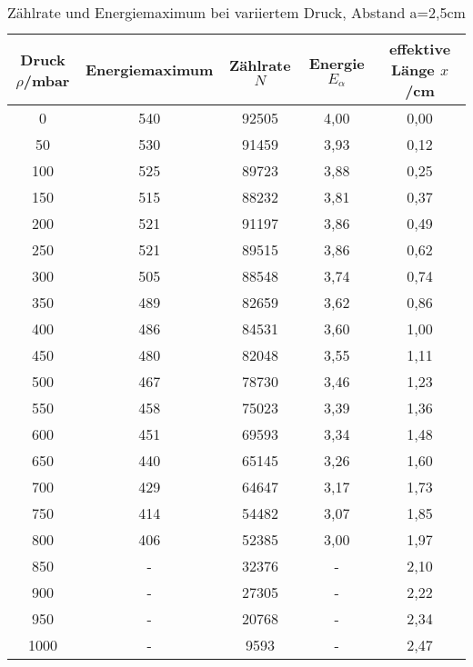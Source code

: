 \begin{table}[H]
  \centering
  \caption{Zählrate und Energiemaximum bei variiertem Druck, Abstand a=2,5cm}
  \label{tab:tab1}
    \begin{tabular}{c c c c c}
    \toprule
    Druck $\rho$/\;mbar & Energiemaximum & Zählrate $N$ & Energie $E_{\alpha}$ & effektive Länge $x$/\;cm\\
    \midrule
    0 & 540 & 92505 & 4,00 & 0,00\\
    50 & 530 & 91459& 3,93 & 0,12\\
    100 & 525 & 89723& 3,88 & 0,25\\
    150 & 515 & 88232& 3,81 & 0,37\\
    200 & 521 & 91197&3,86 & 0,49\\
    250 & 521 & 89515& 3,86 & 0,62\\
    300 & 505 & 88548& 3,74& 0,74\\
    350 & 489 & 82659& 3,62 & 0,86\\
    400 & 486 & 84531 & 3,60 & 1,00\\
    450 & 480 & 82048 & 3,55 & 1,11\\
    500 & 467 & 78730 & 3,46 & 1,23\\
    550 & 458 & 75023 & 3,39 & 1,36\\
    600 & 451 & 69593 & 3,34 & 1,48\\
    650 & 440 & 65145& 3,26 & 1,60\\
    700 & 429 & 64647& 3,17 & 1,73\\
    750 & 414 & 54482& 3,07 & 1,85\\
    800 & 406 & 52385& 3,00 & 1,97\\
    850 & -   & 32376& - & 2,10\\
    900 & -   & 27305& -  & 2,22\\
    950 & -   & 20768& -  & 2,34\\
    1000& -   & 9593& -    & 2,47\\
    \bottomrule
    \end{tabular}
  \end{table}
